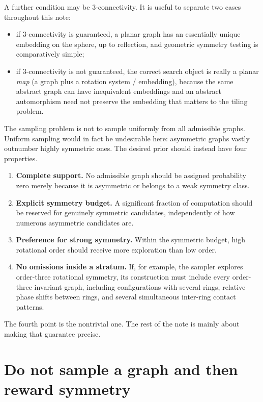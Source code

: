 \documentclass[11pt]{article}
\begin{document}
A further condition may be 3-connectivity. It is useful to separate two cases throughout this note:
\begin{itemize}
  \item if 3-connectivity is guaranteed, a planar graph has an essentially unique embedding on the sphere, up to reflection, and geometric symmetry testing is comparatively simple;
  \item if 3-connectivity is not guaranteed, the correct search object is really a planar \emph{map} (a graph plus a rotation system / embedding), because the same abstract graph can have inequivalent embeddings and an abstract automorphism need not preserve the embedding that matters to the tiling problem.
\end{itemize}

The sampling problem is not to sample uniformly from all admissible graphs. Uniform sampling would in fact be undesirable here: asymmetric graphs vastly outnumber highly symmetric ones. The desired prior should instead have four properties.

\begin{enumerate}
  \item \textbf{Complete support.} No admissible graph should be assigned probability zero merely because it is asymmetric or belongs to a weak symmetry class.
  \item \textbf{Explicit symmetry budget.} A significant fraction of computation should be reserved for genuinely symmetric candidates, independently of how numerous asymmetric candidates are.
  \item \textbf{Preference for strong symmetry.} Within the symmetric budget, high rotational order should receive more exploration than low order.
  \item \textbf{No omissions inside a stratum.} If, for example, the sampler explores order-three rotational symmetry, its construction must include every order-three invariant graph, including configurations with several rings, relative phase shifts between rings, and several simultaneous inter-ring contact patterns.
\end{enumerate}

The fourth point is the nontrivial one. The rest of the note is mainly about making that guarantee precise.

\section{Do not sample a graph and then reward symmetry}
\end{document}
